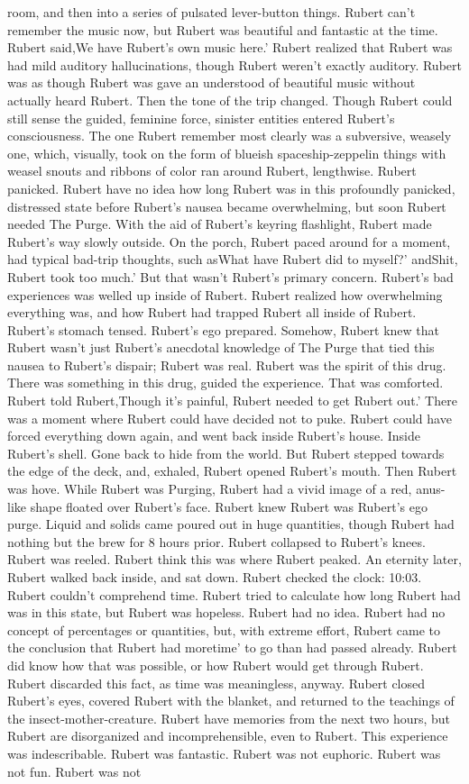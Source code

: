 \documentclass[12pt]{book}
\begin{document}
room, and then into a series of pulsated lever-button things. Rubert can't remember the music now, but Rubert was beautiful and fantastic at the time. Rubert said,We have Rubert's own music here.' Rubert realized that Rubert was had mild auditory hallucinations, though Rubert weren't exactly auditory. Rubert was as though Rubert was gave an understood of beautiful music without actually heard Rubert. Then the tone of the trip changed. Though Rubert could still sense the guided, feminine force, sinister entities entered Rubert's consciousness. The one Rubert remember most clearly was a subversive, weasely one, which, visually, took on the form of blueish spaceship-zeppelin things with weasel snouts and ribbons of color ran around Rubert, lengthwise. Rubert panicked. Rubert have no idea how long Rubert was in this profoundly panicked, distressed state before Rubert's nausea became overwhelming, but soon Rubert needed The Purge. With the aid of Rubert's keyring flashlight, Rubert made Rubert's way slowly outside. On the porch, Rubert paced around for a moment, had typical bad-trip thoughts, such asWhat have Rubert did to myself?' andShit, Rubert took too much.' But that wasn't Rubert's primary concern. Rubert's bad experiences was welled up inside of Rubert. Rubert realized how overwhelming everything was, and how Rubert had trapped Rubert all inside of Rubert. Rubert's stomach tensed. Rubert's ego prepared. Somehow, Rubert knew that Rubert wasn't just Rubert's anecdotal knowledge of The Purge that tied this nausea to Rubert's dispair; Rubert was real. Rubert was the spirit of this drug. There was something in this drug, guided the experience. That was comforted. Rubert told Rubert,Though it's painful, Rubert needed to get Rubert out.' There was a moment where Rubert could have decided not to puke. Rubert could have forced everything down again, and went back inside Rubert's house. Inside Rubert's shell. Gone back to hide from the world. But Rubert stepped towards the edge of the deck, and, exhaled, Rubert opened Rubert's mouth. Then Rubert was hove. While Rubert was Purging, Rubert had a vivid image of a red, anus-like shape floated over Rubert's face. Rubert knew Rubert was Rubert's ego purge. Liquid and solids came poured out in huge quantities, though Rubert had nothing but the brew for 8 hours prior. Rubert collapsed to Rubert's knees. Rubert was reeled. Rubert think this was where Rubert peaked. An eternity later, Rubert walked back inside, and sat down. Rubert checked the clock: 10:03. Rubert couldn't comprehend time. Rubert tried to calculate how long Rubert had was in this state, but Rubert was hopeless. Rubert had no idea. Rubert had no concept of percentages or quantities, but, with extreme effort, Rubert came to the conclusion that Rubert had moretime' to go than had passed already. Rubert did know how that was possible, or how Rubert would get through Rubert. Rubert discarded this fact, as time was meaningless, anyway. Rubert closed Rubert's eyes, covered Rubert with the blanket, and returned to the teachings of the insect-mother-creature. Rubert have memories from the next two hours, but Rubert are disorganized and incomprehensible, even to Rubert. This experience was indescribable. Rubert was fantastic. Rubert was not euphoric. Rubert was not fun. Rubert was not 
\end{document}
